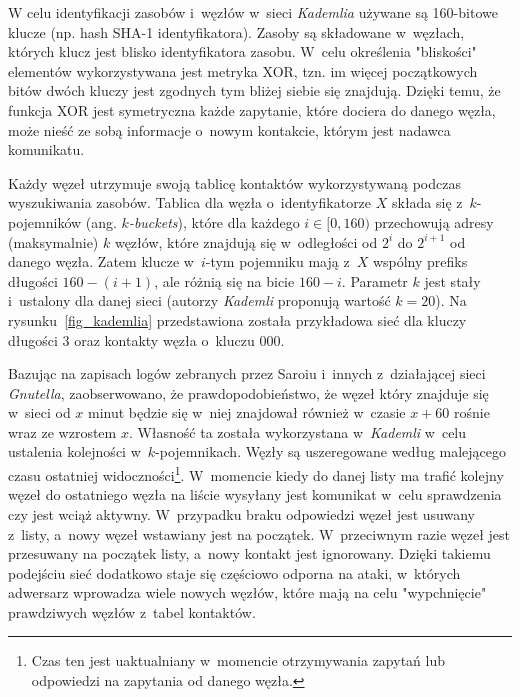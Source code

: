 \documentclass[a4paper,11pt]{scrartcl}
\begin{document}
W celu identyfikacji zasobów i~węzłów w~sieci \textit{Kademlia} używane są 160-bitowe klucze (np. hash SHA-1 identyfikatora). Zasoby są składowane w~węzłach, których klucz jest blisko identyfikatora zasobu. W~celu określenia "bliskości" elementów wykorzystywana jest metryka XOR, tzn. im więcej początkowych bitów dwóch kluczy jest zgodnych tym bliżej siebie się znajdują. Dzięki temu, że funkcja XOR jest symetryczna każde zapytanie, które dociera do danego węzła, może nieść ze sobą informacje o~nowym kontakcie, którym jest nadawca komunikatu.

Każdy węzeł utrzymuje swoją tablicę kontaktów wykorzystywaną podczas wyszukiwania zasobów. Tablica dla węzła o~identyfikatorze $X$ składa się z~$k$-pojemników (ang. \textit{$k$-buckets}), które dla każdego $i \in [0, 160)$ przechowują adresy (maksymalnie) $k$ węzłów, które znajdują się w~odległości od $2^i$ do $2^{i+1}$ od danego węzła. Zatem klucze w~$i$-tym pojemniku mają z~$X$ wspólny prefiks długości $160-(i+1)$, ale różnią się na bicie $160-i$. Parametr $k$ jest stały i~ustalony dla danej sieci (autorzy \textit{Kademli} proponują wartość $k=20$). Na rysunku~\ref{fig_kademlia} przedstawiona została przykładowa sieć dla kluczy długości $3$ oraz kontakty węzła o~kluczu $000$. 

Bazując na zapisach logów zebranych przez Saroiu i~innych \cite{saroiu2001measurement} z~działającej sieci \textit{Gnutella}, zaobserwowano, że prawdopodobieństwo, że węzeł który znajduje się w~sieci od $x$ minut będzie się w~niej znajdował również w~czasie $x+60$ rośnie wraz ze wzrostem $x$. Własność ta została wykorzystana w~\textit{Kademli} w~celu ustalenia kolejności w~$k$-pojemnikach. Węzły są uszeregowane według malejącego czasu ostatniej widoczności\footnote{Czas ten jest uaktualniany w~momencie otrzymywania zapytań lub odpowiedzi na zapytania od danego węzła.}. W~momencie kiedy do danej listy ma trafić kolejny węzeł do ostatniego węzła na liście wysyłany jest komunikat w~celu sprawdzenia czy jest wciąż aktywny. W~przypadku braku odpowiedzi węzeł jest usuwany z~listy, a~nowy węzeł wstawiany jest na początek. W~przeciwnym razie węzeł jest przesuwany na początek listy, a~nowy kontakt jest ignorowany. Dzięki takiemu podejściu sieć dodatkowo staje się częściowo odporna na ataki, w~których adwersarz wprowadza wiele nowych węzłów, które mają na celu "wypchnięcie" prawdziwych węzłów z~tabel kontaktów.
\end{document}

